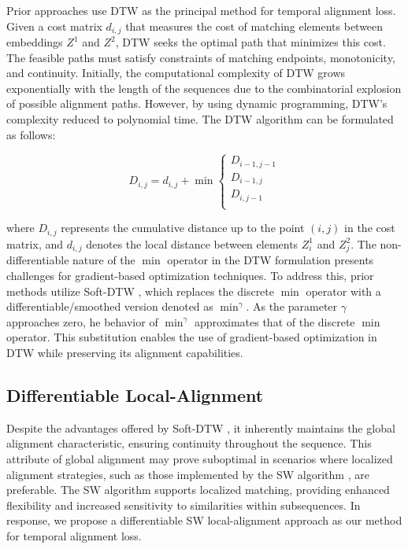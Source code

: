 Prior approaches \cite{2021_lav, 2021_gta} use DTW as the principal method for temporal alignment loss. Given a cost matrix $d_{i, j}$ that measures the cost of matching elements between embeddings $Z^1$ and $Z^2$, DTW seeks the optimal path that minimizes this cost. The feasible paths must satisfy constraints of matching endpoints, monotonicity, and continuity. Initially, the computational complexity of DTW grows exponentially with the length of the sequences due to the combinatorial explosion of possible alignment paths. However, by using dynamic programming, DTW's complexity reduced to polynomial time. The DTW algorithm can be formulated as follows:

\begin{equation}
    D_{i, j} = d_{i, j} + \min \left\{
    \begin{array}{l}
         D_{i-1, j-1} \\
         D_{i-1, j} \\
         D_{i, j-1} \\
    \end{array}
    \right.
    \label{eq: dtw}
\end{equation}

where $D_{i, j}$ represents the cumulative distance up to the point $(i, j)$ in the cost matrix, and $d_{i, j}$ denotes the local distance between elements $Z^1_i$ and $Z^2_j$. The non-differentiable nature of the $\min$ operator in the DTW formulation presents challenges for gradient-based optimization techniques. To address this, prior methods \cite{2021_lav, 2021_gta} utilize Soft-DTW \cite{2017_softdtw}, which replaces the discrete $\min$ operator with a differentiable/smoothed version denoted as $\min^\gamma$. As the parameter $\gamma$ approaches zero, he behavior of $\min^\gamma$ approximates that of the discrete $\min$ operator. This substitution enables the use of gradient-based optimization in DTW while preserving its alignment capabilities.

\subsection{Differentiable Local-Alignment} \label{sec: 3_diffla}

Despite the advantages offered by Soft-DTW \cite{2017_softdtw}, it inherently maintains the global alignment characteristic, ensuring continuity throughout the sequence. This attribute of global alignment may prove suboptimal in scenarios where localized alignment strategies, such as those implemented by the SW algorithm \cite{1981_sw}, are preferable. The SW algorithm \cite{1981_sw} supports localized matching, providing enhanced flexibility and increased sensitivity to similarities within subsequences. In response, we propose a differentiable SW local-alignment approach as our method for temporal alignment loss.

